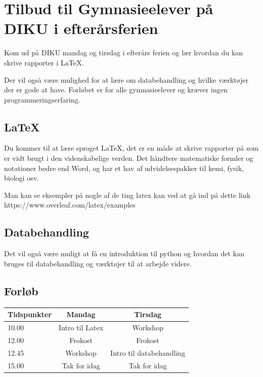 \documentclass[14pt]{article}
\begin{document}
    \newpage                %
    \setcounter{page}{1}    %
\section*{Tilbud til Gymnasieelever på DIKU i efterårsferien}
Kom ud på DIKU mandag og tirsdag i efterårs ferien og lær hvordan du kan skrive
rapporter i LaTeX.

Der vil også være mulighed for at lære om databehandling og hvilke værktøjer der
er gode at have. Forløbet er for alle gymnasieelever og kræver ingen
programmeringserfaring.
\subsection*{LaTeX}
    Du kommer til at lære sproget LaTeX, det er en måde at skrive rapporter på
    som er vidt brugt i den videnskabelige verden. Det håndtere matematiske
    formler og notationer bedre end Word, og har et hav af udvidelsespakker til
    kemi, fysik, biologi osv.

    Man kan se eksempler på nogle af de ting latex kan ved at gå ind på dette
    link https://www.overleaf.com/latex/examples

\subsection*{Databehandling}
Det vil også være muligt at få en introduktion til python og hvordan det kan
bruges til databehandling og værktøjer til at arbejde videre.

\subsection*{Forløb}

\Large{
\begin{center}
\begin{tabular}{ l || c | c }
    Tidspunkter &  Mandag & Tirsdag \\
    \hline
    10.00 & Intro til Latex & Workshop \\
    12.00 & Frokost         & Frokost \\
    12.45 & Workshop        & Intro til databehandling \\
    15.00 & Tak for idag    & Tak for idag \\
\end{tabular}
\end{center}
}
\end{document}
